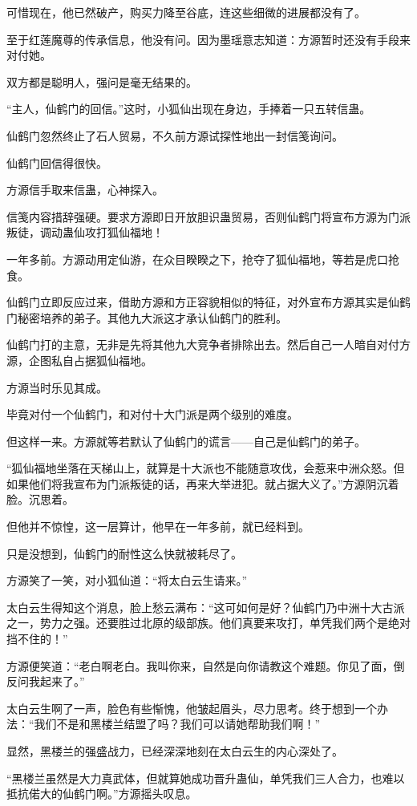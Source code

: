 \begin{this_body}
可惜现在，他已然破产，购买力降至谷底，连这些细微的进展都没有了。

至于红莲魔尊的传承信息，他没有问。因为墨瑶意志知道：方源暂时还没有手段来对付她。

双方都是聪明人，强问是毫无结果的。

“主人，仙鹤门的回信。”这时，小狐仙出现在身边，手捧着一只五转信蛊。

仙鹤门忽然终止了石人贸易，不久前方源试探性地出一封信笺询问。

仙鹤门回信得很快。

方源信手取来信蛊，心神探入。

信笺内容措辞强硬。要求方源即日开放胆识蛊贸易，否则仙鹤门将宣布方源为门派叛徒，调动蛊仙攻打狐仙福地！

一年多前。方源动用定仙游，在众目睽睽之下，抢夺了狐仙福地，等若是虎口抢食。

仙鹤门立即反应过来，借助方源和方正容貌相似的特征，对外宣布方源其实是仙鹤门秘密培养的弟子。其他九大派这才承认仙鹤门的胜利。

仙鹤门打的主意，无非是先将其他九大竞争者排除出去。然后自己一人暗自对付方源，企图私自占据狐仙福地。

方源当时乐见其成。

毕竟对付一个仙鹤门，和对付十大门派是两个级别的难度。

但这样一来。方源就等若默认了仙鹤门的谎言——自己是仙鹤门的弟子。

“狐仙福地坐落在天梯山上，就算是十大派也不能随意攻伐，会惹来中洲众怒。但如果他们将我宣布为门派叛徒的话，再来大举进犯。就占据大义了。”方源阴沉着脸。沉思着。

但他并不惊惶，这一层算计，他早在一年多前，就已经料到。

只是没想到，仙鹤门的耐性这么快就被耗尽了。

方源笑了一笑，对小狐仙道：“将太白云生请来。”

太白云生得知这个消息，脸上愁云满布：“这可如何是好？仙鹤门乃中洲十大古派之一，势力之强。还要胜过北原的级部族。他们真要来攻打，单凭我们两个是绝对挡不住的！”

方源便笑道：“老白啊老白。我叫你来，自然是向你请教这个难题。你见了面，倒反问我起来了。”

太白云生啊了一声，脸色有些惭愧，他皱起眉头，尽力思考。终于想到一个办法：“我们不是和黑楼兰结盟了吗？我们可以请她帮助我们啊！”

显然，黑楼兰的强盛战力，已经深深地刻在太白云生的内心深处了。

“黑楼兰虽然是大力真武体，但就算她成功晋升蛊仙，单凭我们三人合力，也难以抵抗偌大的仙鹤门啊。”方源摇头叹息。


\end{this_body}
